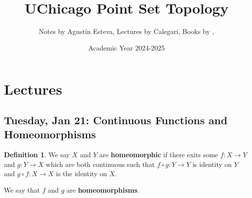 \documentclass[10pt, oneside]{article}
\title{UChicago Point Set Topology}
\author{Notes by Agustín Esteva, Lectures by Calegari, Books by , }
\date{Academic Year 2024-2025}
\theoremstyle{definition}
\newtheorem{defn}{Definition}
\begin{document}
\maketitle
\tableofcontents

\vspace{.25in}

\section{Lectures}

\subsection{Tuesday, Jan 21: Continuous Functions and Homeomorphisms}
\begin{defn}
    We say $X$ and $Y$ are \textbf{homeomorphic} if there exits some $f: X \to Y$ and $g: Y \to X$ which are both continuous such that $f\circ g: Y\to Y$ is identity on $Y$ and $g\circ f: X \to X$ is the identity on $X.$

    We say that $f$ and $g$ are \textbf{homeomorphisms}.
\end{defn}
\end{document}
